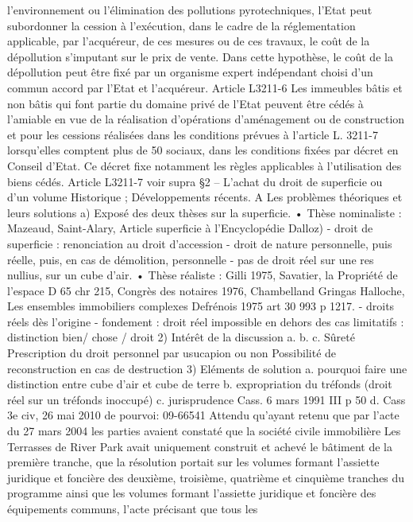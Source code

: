 \documentclass[11pt,a4paper]{report}
\begin{document}
	l'environnement ou l'élimination des pollutions pyrotechniques, l'Etat peut subordonner la cession à l'exécution,
	dans le cadre de la réglementation applicable, par l'acquéreur, de ces mesures ou de ces travaux, le coût de la
	dépollution s'imputant sur le prix de vente. Dans cette hypothèse, le coût de la dépollution peut être fixé par un
	organisme expert indépendant choisi d'un commun accord par l'Etat et l'acquéreur.
	Article L3211-6 Les immeubles bâtis et non bâtis qui font partie du domaine privé de l'Etat peuvent être cédés
	à l'amiable en vue de la réalisation d'opérations d'aménagement ou de construction et pour les cessions
	réalisées dans les conditions prévues à l'article L. 3211-7 lorsqu'elles comptent plus de 50 %
	sociaux, dans les conditions fixées par décret en Conseil d'Etat. Ce décret fixe notamment les règles
	applicables à l'utilisation des biens cédés.
	Article L3211-7 voir supra
	§2 – L’achat du droit de superficie ou d’un volume
	Historique ; Développements récents.
	A Les problèmes théoriques et leurs solutions
	a)
	Exposé des deux thèses sur la superficie.
	• Thèse nominaliste : Mazeaud, Saint-Alary, Article superficie à l’Encyclopédie Dalloz)
	- droit de superficie : renonciation au droit d’accession
	- droit de nature personnelle, puis réelle, puis, en cas de démolition, personnelle
	- pas de droit réel sur une res nullius, sur un cube d’air.
	• Thèse réaliste : Gilli 1975, Savatier, la Propriété de l’espace D 65 chr 215, Congrès des
	notaires 1976, Chambelland Gringas Halloche, Les ensembles immobiliers complexes
	Defrénois 1975 art 30 993 p 1217.
	- droits réels dès l’origine
	- fondement : droit réel impossible en dehors des cas limitatifs :
	distinction bien/ chose / droit
	2) Intérêt de la discussion
	a.
	b.
	c.
	Sûreté
	Prescription du droit personnel par usucapion ou non
	Possibilité de reconstruction en cas de destruction
	3) Eléments de solution
	a. pourquoi faire une distinction entre cube d’air et cube de terre
	b. expropriation du tréfonds (droit réel sur un tréfonds inoccupé)
	c. jurisprudence Cass. 6 mars 1991 III  p 50
	d. Cass 3e civ, 26 mai 2010 \No  de pourvoi: 09-66541
	Attendu qu'ayant retenu que par l'acte du 27 mars 2004 les parties avaient constaté
	que la société civile immobilière Les Terrasses de River Park avait uniquement
	construit et achevé le bâtiment de la première tranche, que la résolution portait sur
	les volumes formant l'assiette juridique et foncière des deuxième, troisième,
	quatrième et cinquième tranches du programme ainsi que les volumes formant
	l'assiette juridique et foncière des équipements communs, l'acte précisant que tous les
\end{document}
